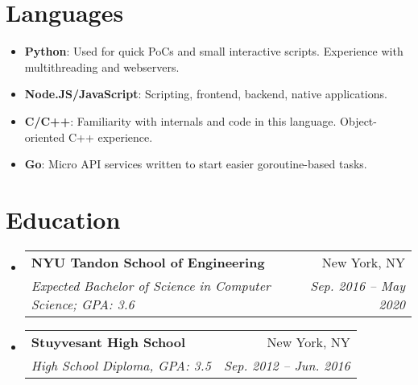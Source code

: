 \documentclass[letterpaper,10pt]{article}
\makeatletter
\newcommand{\resumeItem}[2]{
  \vspace{-1pt}
  \item\small{
    \textbf{#1}{: #2 }
  }
}
\newcommand{\resumeSubheading}[4]{
  \item\begin{tabular*}{0.97\textwidth}{l@{\extracolsep{\fill}}r}
      \large\textbf{#1} & #2 \\
      \textit{\small#3} & \textit{\small #4} \\
    \end{tabular*}\vspace{-5pt}
}
\newcommand{\resumeSubHeadingListStart}{\begin{itemize}[leftmargin=*]}
\newcommand{\resumeSubHeadingListEnd}{\end{itemize}}
\makeatother
\begin{document}
\section{Languages}
\resumeSubHeadingListStart
  \resumeItem{Python}{Used for quick PoCs and small interactive scripts. Experience with multithreading and webservers.}
  \resumeItem{Node.JS/JavaScript}{Scripting, frontend, backend, native applications.}
  \resumeItem{C/C++}{Familiarity with internals and code in this language. Object-oriented C++ experience.}
  \resumeItem{Go}{Micro API services written to start easier goroutine-based tasks.}
\resumeSubHeadingListEnd

\section{Education}

\resumeSubHeadingListStart
  \resumeSubheading
    {NYU Tandon School of Engineering}{New York, NY}
    {Expected Bachelor of Science in Computer Science; GPA: 3.6}{Sep. 2016 -- May 2020}
  \resumeSubheading
    {Stuyvesant High School}{New York, NY}
    {High School Diploma, GPA: 3.5}{Sep. 2012 -- Jun. 2016}
\resumeSubHeadingListEnd

\end{document}
